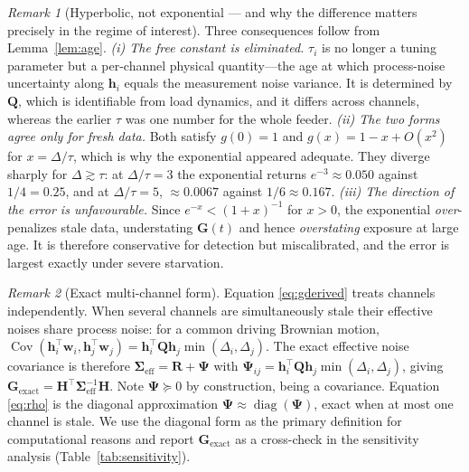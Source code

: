 \documentclass[journal]{IEEEtran}
\theoremstyle{plain}
\theoremstyle{definition}
\theoremstyle{remark}
\newtheorem{remark}{Remark}
\newcommand{\bh}{\mathbf{h}}
\newcommand{\bH}{\mathbf{H}}
\newcommand{\bG}{\mathbf{G}}
\newcommand{\bSigma}{\boldsymbol{\Sigma}}
\newcommand{\bQ}{\mathbf{Q}}
\newcommand{\bR}{\mathbf{R}}
\newcommand{\bPsi}{\boldsymbol{\Psi}}
\begin{document}
\begin{remark}[Hyperbolic, not exponential --- and why the difference
matters precisely in the regime of interest]
\label{rem:hyperbolic}
Three consequences follow from Lemma~\ref{lem:age}.
\emph{(i) The free constant is eliminated.} $\tau_i$ is no longer a tuning
parameter but a per-channel physical quantity---the age at which
process-noise uncertainty along $\bh_i$ equals the measurement noise
variance. It is determined by $\bQ$, which is identifiable from load
dynamics, and it differs across channels, whereas the earlier $\tau$ was
one number for the whole feeder.
\emph{(ii) The two forms agree only for fresh data.} Both satisfy
$g(0)=1$ and $g(x)=1-x+O(x^{2})$ for $x=\Delta/\tau$, which is why the
exponential appeared adequate. They diverge sharply for $\Delta\gtrsim\tau$:
at $\Delta/\tau=3$ the exponential returns $e^{-3}\approx0.050$ against
$1/4=0.25$, and at $\Delta/\tau=5$, $\approx0.0067$ against
$1/6\approx0.167$.
\emph{(iii) The direction of the error is unfavourable.} Since
$e^{-x}<(1+x)^{-1}$ for $x>0$, the exponential \emph{over}-penalizes stale
data, understating $\bG(t)$ and hence \emph{overstating} exposure at large
age. It is therefore conservative for detection but miscalibrated, and the
error is largest exactly under severe starvation.
\end{remark}

\begin{remark}[Exact multi-channel form]
\label{rem:exactage}
Equation \eqref{eq:gderived} treats channels independently. When several
channels are simultaneously stale their effective noises share process
noise: for a common driving Brownian motion,
$\operatorname{Cov}(\bh_i^{\top}\mathbf{w}_i,\bh_j^{\top}\mathbf{w}_j)
=\bh_i^{\top}\bQ\bh_j\min(\Delta_i,\Delta_j)$. The exact effective noise
covariance is therefore $\bSigma_{\mathrm{eff}}=\bR+\bPsi$ with
$\bPsi_{ij}=\bh_i^{\top}\bQ\bh_j\min(\Delta_i,\Delta_j)$, giving
$\bG_{\mathrm{exact}}=\bH^{\top}\bSigma_{\mathrm{eff}}^{-1}\bH$. Note
$\bPsi\succeq0$ by construction, being a covariance. Equation
\eqref{eq:rho} is the diagonal approximation
$\bPsi\approx\operatorname{diag}(\bPsi)$, exact when at most one channel
is stale. We use the diagonal form as the primary definition for
computational reasons and report $\bG_{\mathrm{exact}}$ as a cross-check
in the sensitivity analysis (Table~\ref{tab:sensitivity}).
\end{remark}
\end{document}
